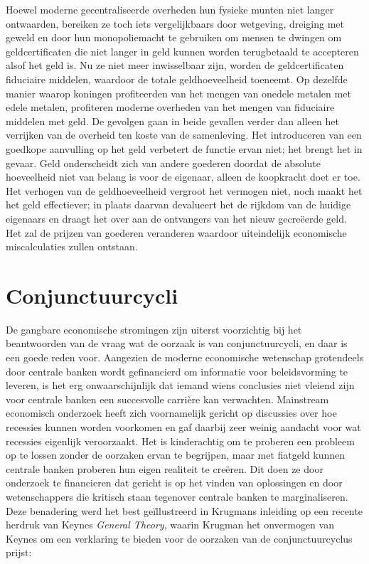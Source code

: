 Hoewel moderne gecentraliseerde overheden hun fysieke munten niet langer ontwaarden, bereiken ze toch iets vergelijkbaars door wetgeving, dreiging met geweld en door hun monopoliemacht te gebruiken om mensen te dwingen om geldcertificaten die niet langer in geld kunnen worden terugbetaald te accepteren alsof het geld is. Nu ze niet meer inwisselbaar zijn, worden de geldcertificaten fiduciaire middelen, waardoor de totale geldhoeveelheid toeneemt. Op dezelfde manier waarop koningen profiteerden van het mengen van onedele metalen met edele metalen, profiteren moderne overheden van het mengen van fiduciaire middelen met geld. De gevolgen gaan in beide gevallen verder dan alleen het verrijken van de overheid ten koste van de samenleving. Het introduceren van een goedkope aanvulling op het geld verbetert de functie ervan niet; het brengt het in gevaar. Geld onderscheidt zich van andere goederen doordat de absolute hoeveelheid niet van belang is voor de eigenaar, alleen de koopkracht doet er toe. Het verhogen van de geldhoeveelheid vergroot het vermogen niet, noch maakt het het geld effectiever; in plaats daarvan devalueert het de rijkdom van de huidige eigenaars en draagt het over aan de ontvangers van het nieuw gecreëerde geld. Het zal de prijzen van goederen veranderen waardoor uiteindelijk economische miscalculaties zullen ontstaan.

\hypertarget{conjunctuurcycli}{%
\section{Conjunctuurcycli}\label{conjunctuurcycli}}

De gangbare economische stromingen zijn uiterst voorzichtig bij het beantwoorden van de vraag wat de oorzaak is van conjunctuurcycli, en daar is een goede reden voor. Aangezien de moderne economische wetenschap grotendeels door centrale banken wordt gefinancierd om informatie voor beleidsvorming te leveren, is het erg onwaarschijnlijk dat iemand wiens conclusies niet vleiend zijn voor centrale banken een succesvolle carrière kan verwachten.\autocite{173} Mainstream economisch onderzoek heeft zich voornamelijk gericht op discussies over hoe recessies kunnen worden voorkomen en gaf daarbij zeer weinig aandacht voor wat recessies eigenlijk veroorzaakt. Het is kinderachtig om te proberen een probleem op te lossen zonder de oorzaken ervan te begrijpen, maar met fiatgeld kunnen centrale banken proberen hun eigen realiteit te creëren. Dit doen ze door onderzoek te financieren dat gericht is op het vinden van oplossingen en door wetenschappers die kritisch staan tegenover centrale banken te marginaliseren. Deze benadering werd het best geïllustreerd in Krugmans inleiding op een recente herdruk van Keynes\textquotesingle{} \emph{General Theory}, waarin Krugman het onvermogen van Keynes om een verklaring te bieden voor de oorzaken van de conjunctuurcyclus prijst:

